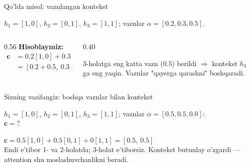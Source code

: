 \documentclass[aspectratio=169,11pt]{beamer}
\begin{document}
\begin{frame}{Qo'lda misol: vaznlangan kontekst}
  \begin{tcolorbox}[defbox,title={Berilgan vaznlar bilan kontekst}]
    \small $h_1=[1,0]$, $h_2=[0,1]$, $h_3=[1,1]$; vaznlar $\alpha=[0.2, 0.3, 0.5]$.
  \end{tcolorbox}
  \vspace{0.2em}
  \begin{columns}[T]
    \begin{column}{0.56\textwidth}
      \textbf{Hisoblaymiz:}
      \begin{align*}
        \mathbf{c} &= 0.2[1,0] + 0.3[0,1] + 0.5[1,1]\\
          &= [0.2+0.5,\ 0.3+0.5] = [0.7,\ 0.8]
      \end{align*}
    \end{column}
    \begin{column}{0.40\textwidth}
      \begin{tcolorbox}[okbox,top=2pt,bottom=2pt]
        \footnotesize
        3-holatga eng katta vazn ($0.5$) berildi $\Rightarrow$ kontekst $h_3$ ga
        eng yaqin. Vaznlar "qayerga qarashni" boshqaradi.
      \end{tcolorbox}
    \end{column}
  \end{columns}
\end{frame}

\begin{frame}{Sizning vazifangiz: boshqa vaznlar bilan kontekst}
  \begin{tcolorbox}[warnbox,title=Savol --- 60 soniya]
    \small
    $h_1=[1,0]$, $h_2=[0,1]$, $h_3=[1,1]$; vaznlar $\alpha=[0.5, 0.5, 0.0]$:\\[4pt]
    \textbf{\large $\mathbf{c} = ?$}
  \end{tcolorbox}
  \pause
  \begin{tcolorbox}[okbox,title=Javob]
    \small
    $\mathbf{c} = 0.5[1,0] + 0.5[0,1] + 0[1,1] = [0.5,\ 0.5]$\\[3pt]
    \footnotesize Endi e'tibor 1- va 2-holatda; 3-holat e'tiborsiz. Kontekst
    butunlay o'zgardi --- attention shu moslashuvchanlikni beradi.
  \end{tcolorbox}
\end{frame}
\end{document}
